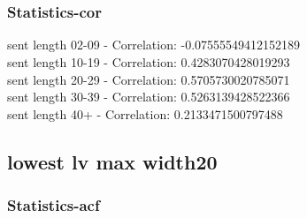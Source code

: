 \documentclass{article}%
\begin{document}
\begin{figure}[ht]%
\centering%
\setlength{\abovecaptionskip}{-35pt}%
%
%
\\%
%
%
\\%
%
\end{figure}

%
\newpage%
\subsubsection{Statistics{-}cor}%
\label{ssubsec:Statistics{-}cor}%
\noindent%
sent length 02-09 - Correlation: -0.07555549412152189\\%
sent length 10-19 - Correlation: 0.4283070428019293\\%
sent length 20-29 - Correlation: 0.5705730020785071\\%
sent length 30-39 - Correlation: 0.5263139428522366\\%
sent length 40+ - Correlation: 0.2133471500797488\\

%
\newpage

%
\subsection{lowest lv max width20}%
\label{subsec:lowestlvmaxwidth20}%
\subsubsection{Statistics{-}acf}%
\label{ssubsec:Statistics{-}acf}%
\end{document}
